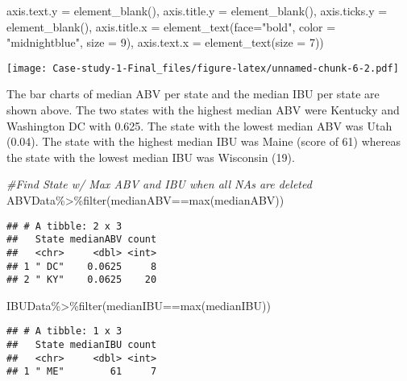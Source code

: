 \documentclass[
]{article}
\newenvironment{Shaded}{\begin{snugshade}}{\end{snugshade}}
\newcommand{\AttributeTok}[1]{\textcolor[rgb]{0.77,0.63,0.00}{#1}}
\newcommand{\CommentTok}[1]{\textcolor[rgb]{0.56,0.35,0.01}{\textit{#1}}}
\newcommand{\DecValTok}[1]{\textcolor[rgb]{0.00,0.00,0.81}{#1}}
\newcommand{\FunctionTok}[1]{\textcolor[rgb]{0.00,0.00,0.00}{#1}}
\newcommand{\NormalTok}[1]{#1}
\newcommand{\SpecialCharTok}[1]{\textcolor[rgb]{0.00,0.00,0.00}{#1}}
\newcommand{\StringTok}[1]{\textcolor[rgb]{0.31,0.60,0.02}{#1}}
\begin{document}
\begin{Shaded}
\begin{Highlighting}[]
        \AttributeTok{axis.text.y =} \FunctionTok{element\_blank}\NormalTok{(),}
        \AttributeTok{axis.title.y =} \FunctionTok{element\_blank}\NormalTok{(),}
        \AttributeTok{axis.ticks.y =} \FunctionTok{element\_blank}\NormalTok{(),}
        \AttributeTok{axis.title.x =} \FunctionTok{element\_text}\NormalTok{(}\AttributeTok{face=}\StringTok{"bold"}\NormalTok{, }\AttributeTok{color =} \StringTok{"midnightblue"}\NormalTok{, }\AttributeTok{size =} \DecValTok{9}\NormalTok{),}
        \AttributeTok{axis.text.x =} \FunctionTok{element\_text}\NormalTok{(}\AttributeTok{size =} \DecValTok{7}\NormalTok{))}
\end{Highlighting}
\end{Shaded}

\texttt{[image: Case-study-1-Final\_files/figure-latex/unnamed-chunk-6-2.pdf]}

The bar charts of median ABV per state and the median IBU per state are
shown above. The two states with the highest median ABV were Kentucky
and Washington DC with 0.625. The state with the lowest median ABV was
Utah (0.04). The state with the highest median IBU was Maine (score of
61) whereas the state with the lowest median IBU was Wisconsin (19).

\begin{Shaded}
\begin{Highlighting}[]
\CommentTok{\#Find State w/ Max ABV and IBU when all NAs are deleted}
\NormalTok{ABVData}\SpecialCharTok{\%\textgreater{}\%}\FunctionTok{filter}\NormalTok{(medianABV}\SpecialCharTok{==}\FunctionTok{max}\NormalTok{(medianABV))}
\end{Highlighting}
\end{Shaded}

\begin{verbatim}
## # A tibble: 2 x 3
##   State medianABV count
##   <chr>     <dbl> <int>
## 1 " DC"    0.0625     8
## 2 " KY"    0.0625    20
\end{verbatim}

\begin{Shaded}
\begin{Highlighting}[]
\NormalTok{IBUData}\SpecialCharTok{\%\textgreater{}\%}\FunctionTok{filter}\NormalTok{(medianIBU}\SpecialCharTok{==}\FunctionTok{max}\NormalTok{(medianIBU))}
\end{Highlighting}
\end{Shaded}

\begin{verbatim}
## # A tibble: 1 x 3
##   State medianIBU count
##   <chr>     <dbl> <int>
## 1 " ME"        61     7
\end{verbatim}
\end{document}

